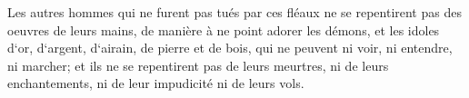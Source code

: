 \verse Les autres hommes qui ne furent pas tués par ces fléaux ne se repentirent pas des oeuvres de leurs mains, de manière à ne point adorer les démons, et les idoles d`or, d`argent, d`airain, de pierre et de bois, qui ne peuvent ni voir, ni entendre, ni marcher; 
\verse et ils ne se repentirent pas de leurs meurtres, ni de leurs enchantements, ni de leur impudicité ni de leurs vols. 

\chapter{}

